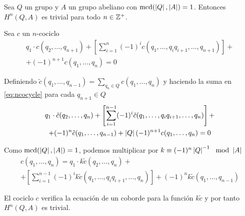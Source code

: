 \begin{lema}\label{lem:trivh2}%
	Sea $Q$ un grupo y $A$ un grupo abeliano con $\operatorname{mcd}(\left|Q\right|, \left|A\right|) = 1$. Entonces $H^n(Q,A)$ es trivial para todo $n\in\mathbb{Z}^+$.
	\begin{demostracion}
		Sea $c$ un $n$-cociclo
		\begin{multline}\label{eq:ncocycle}
			q_1\cdot c(q_2,\hdots,q_{n+1}) + \left[\sum\limits_{i=1}^{n} (-1)^i c(q_1,\hdots,q_iq_{i+1},\hdots,q_{n+1}) \right] + \\ + (-1)^{n+1}c(q_1,\hdots,q_n) = 0
		\end{multline}
		
		Definiendo $\tilde c(q_1,\hdots,q_{n-1}) = {\displaystyle \sum_{q_n\in Q} c(q_1,\hdots,q_{n})}$ y haciendo la suma en \eqref{eq:ncocycle} para cada $q_{n+1} \in Q$
		\begin{multline*}
			q_1\cdot \tilde c(q_2,\hdots,q_n) + \left[\sum\limits_{i=1}^{n-1}(-1)^i \tilde c(q_1,\hdots,q_iq_{i+1},\hdots,q_{n}) \right] +\\+ (-1)^n\tilde c(q_1,\hdots,q_{n-1})+ \left|Q\right|(-1)^{n+1} c(q_1,\hdots,q_n) = 0
		\end{multline*}
		
		Como $\operatorname{mcd}(\left|Q\right|, \left|A\right|) = 1$, podemos multiplicar por $k \equiv (-1)^n\ord{Q}^{-1} \mod \ord{A}$
		\begin{multline*}
			c(q_1,\hdots,q_n) = q_1\cdot k\tilde c(q_2,\hdots,q_n) + \\ + \left[\sum\limits_{i=1}^{n-1}(-1)^i k\tilde c(q_1,\hdots,q_iq_{i+1},\hdots,q_{n}) \right] + (-1)^nk\tilde c(q_1,\hdots,q_{n-1}) 
		\end{multline*}
		
		El cociclo $c$ verifica la ecuación de un coborde para la función $k \tilde c$ y por tanto $H^n(Q,A)$ es trivial.
		
		
	\end{demostracion}
\end{lema}

